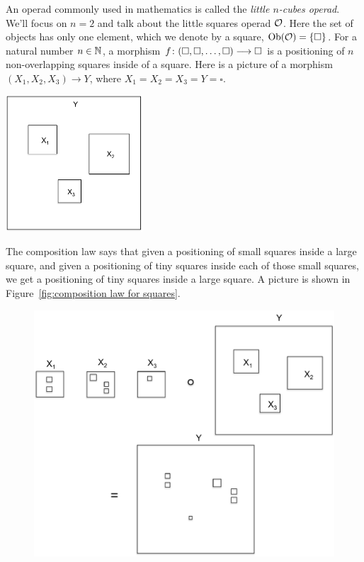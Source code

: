 \documentclass[CT4S-EN-RU]{subfiles}
\begin{document}
\begin{exampleRUS}
\end{exampleRUS}

\begin{exampleENG}\label{ex:little squares}
An operad commonly used in mathematics is called the {\em little $n$-cubes operad}. We'll focus on $n=2$ and talk about the little squares operad $\mathcal{O}$. Here the set of objects has only one element, which we denote by a square, $\textnormal{Ob}(\mathcal{O})=\{\square\}$. For a natural number $n\in{\mathbb N}$, a morphism $f\colon(\square,\square,\ldots,\square)\longrightarrow\square$ is a positioning of $n$ non-overlapping squares inside of a square. Here is a picture of a morphism $(X_1,X_2,X_3)\to Y$, where $X_1=X_2=X_3=Y=\square$.
\begin{center}
\includegraphics[height=2in]{square1}
\end{center}
The composition law says that given a positioning of small squares inside a large square, and given a positioning of tiny squares inside each of those small squares, we get a positioning of tiny squares inside a large square. A picture is shown in Figure~\ref{fig:composition law for squares}.
\begin{figure}[H]
\begin{center}
\includegraphics[width=\textwidth]{square2}

\end{center}
\end{figure}
\end{exampleENG}
\end{document}
